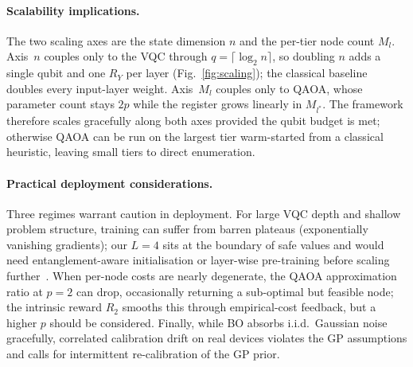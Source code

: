 \documentclass[11pt,a4paper]{article}
\theoremstyle{definition}
\begin{document}
\paragraph{Scalability implications.}
The two scaling axes are the state dimension $n$ and the per-tier node count $M_l$. Axis~$n$ couples only to the VQC through $q\!=\!\lceil\log_2 n\rceil$, so doubling $n$ adds a single qubit and one $R_Y$ per layer (Fig.~\ref{fig:scaling}); the classical baseline doubles every input-layer weight. Axis~$M_l$ couples only to QAOA, whose parameter count stays $2p$ while the register grows linearly in $M_{l^*}$. The framework therefore scales gracefully along both axes provided the qubit budget is met; otherwise QAOA can be run on the largest tier warm-started from a classical heuristic, leaving small tiers to direct enumeration.

\paragraph{Practical deployment considerations.}
Three regimes warrant caution in deployment. For large VQC depth and shallow problem structure, training can suffer from barren plateaus (exponentially vanishing gradients); our $L\!=\!4$ sits at the boundary of safe values and would need entanglement-aware initialisation or layer-wise pre-training before scaling further~\cite{mcclean2018barren}. When per-node costs are nearly degenerate, the QAOA approximation ratio at $p\!=\!2$ can drop, occasionally returning a sub-optimal but feasible node; the intrinsic reward $R_2$ smooths this through empirical-cost feedback, but a higher $p$ should be considered. Finally, while BO absorbs i.i.d.\ Gaussian noise gracefully, correlated calibration drift on real devices violates the GP assumptions and calls for intermittent re-calibration of the GP prior.
\end{document}

